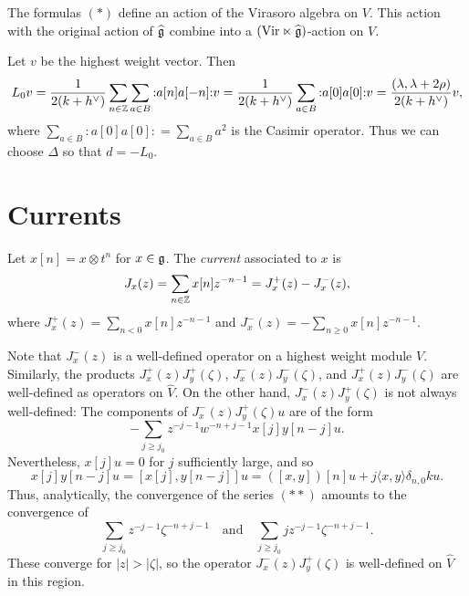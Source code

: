 \begin{theorem}
  The formulas $(*)$ define an action of
  the Virasoro algebra on $V$. This action
  with the original action of $\widehat{\mathfrak{g}}$
  combine into a
  $(\mathrm{Vir} \ltimes \widehat{\mathfrak{g}})$-action on $V$.
\end{theorem}

\begin{remark}
  Let $v$ be the highest weight vector. Then
  \[
    L_0 v
    = \frac{1}{2(k + h^\vee)}
    \sum_{n \in \mathbb{Z}} \sum_{a \in B} {:} a[n] a[-n] {:} v
    = \frac{1}{2(k + h^\vee)}
    \sum_{a \in B} {:} a[0] a[0] {:} v
    = \frac{(\lambda, \lambda + 2\rho)}{2(k + h^\vee)} v,
  \]
  where
  $\sum_{a \in B} {:} a[0] a[0] {:} = \sum_{a \in B} a^2$
  is the Casimir operator. Thus
  we can choose $\Delta$ so that
  $d = -L_0$.
\end{remark}

\section{Currents}

\begin{definition}
  Let $x[n] = x \otimes t^n$ for $x \in \mathfrak{g}$.
  The \emph{current} associated to $x$ is
  \[
    J_x(z) = \sum_{n \in \mathbb{Z}} x[n] z^{-n - 1}
    = J_x^+(z) - J_x^-(z),
  \]
  where $J_x^+(z) = \sum_{n < 0} x[n] z^{-n - 1}$
  and $J_x^-(z) = -\sum_{n \ge 0} x[n] z^{-n - 1}$.
\end{definition}

\begin{remark}
  Note that $J_x^-(z)$ is a well-defined operator
  on a highest weight module $V$. Similarly, the
  products $J_x^+(z) J_y^+(\zeta)$,
  $J_x^-(z) J_y^-(\zeta)$, and
  $J_x^+(z) J_y^-(\zeta)$ are well-defined as
  operators on $\widehat{V}$. On the other hand,
  $J_x^-(z) J_y^+(\zeta)$ is not always well-defined:
  The components of $J_x^-(z) J_y^+(\zeta) u$ are of
  the form
  \[
    -\sum_{j \ge j_0} z^{-j - 1} w^{-n + j - 1}
    x[j] y[n - j] u. \tag{$**$}
  \]
  Nevertheless, $x[j] u = 0$ for $j$ sufficiently
  large, and so
  \[
    x[j] y[n - j] u
    = [x[j], y[n - j]] u
    = ([x, y])[n] u + j \langle x, y \rangle \delta_{n, 0} k u.
  \]
  Thus, analytically, the convergence of the series
  $(**)$ amounts to the convergence of
  \[
    \sum_{j \ge j_0} z^{-j - 1} \zeta^{-n + j - 1}
    \quad \text{and} \quad
    \sum_{j \ge j_0} j z^{-j - 1} \zeta^{-n + j - 1}.
  \]
  These converge for $|z| > |\zeta|$, so the
  operator $J_x^-(z) J_y^+(\zeta)$ is well-defined
  on $\widehat{V}$ in this region.
\end{remark}

